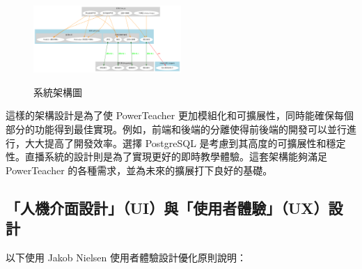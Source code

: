 \documentclass[12pt]{article}
\begin{document}
\begin{enumerate}[label=(\arabic*)]
  \begin{figure}[htb]
    \centering
    \href{https://raw.githubusercontent.com/programingtw/proglearn-plan/main/img/powerteacherarc.png}{
      \includegraphics[width=0.5\textwidth]{../img/powerteacherarc.png}
    }
    \caption{系統架構圖}
    \label{arc1}            
  \end{figure}

  這樣的架構設計是為了使 PowerTeacher 更加模組化和可擴展性，同時能確保每個部分的功能得到最佳實現。例如，前端和後端的分離使得前後端的開發可以並行進行，大大提高了開發效率。選擇 PostgreSQL 是考慮到其高度的可擴展性和穩定性。直播系統的設計則是為了實現更好的即時教學體驗。這套架構能夠滿足 PowerTeacher 的各種需求，並為未來的擴展打下良好的基礎。

\end{enumerate}

\subsection{「人機介面設計」（UI）與「使用者體驗」（UX）設計}
以下使用 Jakob Nielsen 使用者體驗設計優化原則說明：
\end{document}
